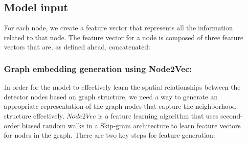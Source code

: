 \subsection{\textbf{Model input}}

For each node, we create a feature vector that represents all the information related to that node. The feature vector for a node is composed of three feature vectors that are, as defined ahead, concatenated:

\subsubsection{Graph embedding generation using Node2Vec:}

In order for the model to effectively learn the spatial relationships between the detector nodes based on graph structure, we need a way to generate an appropriate representation of the graph nodes that capture the neighborhood structure effectively. $Node2Vec$\cite{node2vec} is a feature learning algorithm that uses second-order biased random walks in a Skip-gram architecture to learn feature vectors for nodes in the graph. There are two key steps for feature generation:

